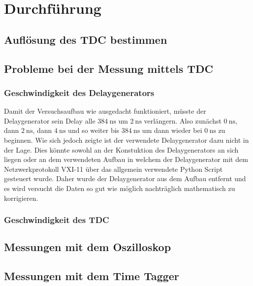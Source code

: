\section{Durchführung}
\label{sec:Durchfuehrung}

\subsection{Auflösung des TDC bestimmen}
\label{sec:AufloesungTDC}

\subsection{Probleme bei der Messung mittels TDC}
\label{sec:ProblemeTDC}

\subsubsection{Geschwindigkeit des Delaygenerators}
\label{sec:Delaygenerator}
Damit der Versuchsaufbau wie ausgedacht funktioniert, müsste der Delaygenerator sein Delay alle 
$\SI{384}{\nano\second}$ um $\SI{2}{\nano\second}$ verlängern. Also zunächst $\SI{0}{\nano\second}$,
dann $\SI{2}{\nano\second}$, dann $\SI{4}{\nano\second}$ und so weiter bis $\SI{384}{\nano\second}$
um dann wieder bei $\SI{0}{\nano\second}$ zu beginnen. Wie sich jedoch zeigte ist der verwendete
Delaygenerator dazu nicht in der Lage. Dies könnte sowohl an der Konstuktion des Delaygenerators an sich 
liegen oder an dem verwendeten Aufbau in welchem der Delaygenerator mit dem Netzwerkprotokoll VXI-11
über das allgemein verwendete Python Script gesteuert wurde. Daher wurde der Delaygenerator aus dem 
Aufbau entfernt und es wird versucht die Daten so gut wie möglich nachträglich mathematisch zu korrigieren.


\subsubsection{Geschwindigkeit des TDC}
\label{sec:GeschwindigkeitTDC}


\subsection{Messungen mit dem Oszilloskop}
\label{sec:MessungenOszilloskop}

\subsection{Messungen mit dem Time Tagger}
\label{sec:MessungenTT}
